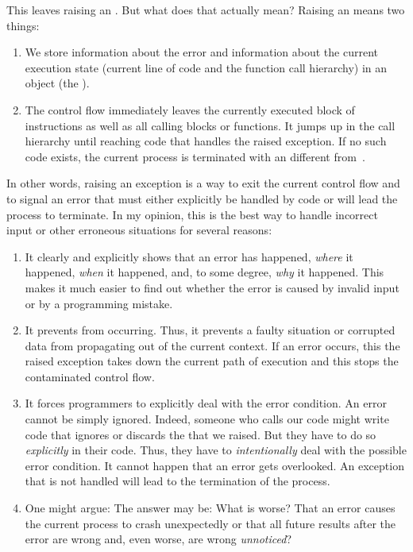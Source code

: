 This leaves raising an .
But what does that actually mean?
Raising an  means two things:%
%
\begin{enumerate}%
%
\item We store information about the error and information about the current execution state (current line of code and the function call hierarchy) in an object (the ).%
%
\item The control flow immediately leaves the currently executed block of instructions as well as all calling blocks or functions.
It jumps up in the call hierarchy until reaching code that handles the raised exception.
If no such code exists, the current process is terminated with an  different from~.%
%
\end{enumerate}%
%
In other words, raising an exception is a way to exit the current control flow and to signal an error that must either explicitly be handled by code or will lead the process to terminate.
In my opinion, this is the best way to handle incorrect input or other erroneous situations for several reasons:%
%
\begin{enumerate}%
%
\item It clearly and explicitly shows that an error has happened, \emph{where} it happened, \emph{when} it happened, and, to some degree, \emph{why} it happened.
This makes it much easier to find out whether the error is caused by invalid input or by a programming mistake.%
%
\item It prevents  from occurring.
Thus, it prevents a faulty situation or corrupted data from propagating out of the current context.
If an error occurs, this the raised exception takes down the current path of execution and this stops the contaminated control flow.%
%
\item It forces programmers to explicitly deal with the error condition.
An error cannot be simply ignored.
Indeed, someone who calls our code might write code that ignores or discards the  that we raised.
But they have to do so \emph{explicitly} in their code.
Thus, they have to \emph{intentionally} deal with the possible error condition.
It cannot happen that an error gets overlooked.
An exception that is not handled will lead to the termination of the process.%
%
\item One might argue: 
The answer may be:
What is worse?
That an error causes the current process to crash unexpectedly or that all future results after the error are wrong and, even worse, are wrong \emph{unnoticed}?%
%
\end{enumerate}%
